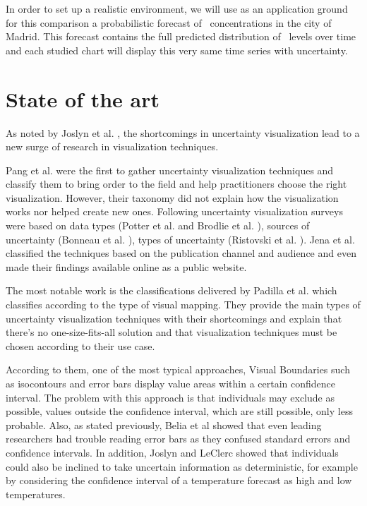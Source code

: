 \documentclass[a4paper,3p,sort&compress]{elsarticle}
\begin{document}
In order to set up a realistic environment, we will use as an application ground
for this comparison a probabilistic forecast of \no~concentrations in the city
of Madrid. This forecast contains the full predicted distribution of \no~levels
over time and each studied chart will display this very same time series with
uncertainty.

\section{State of the art}
\label{sec:results}

As noted by Joslyn et al. \cite{joslyn_communicating_2010}, the shortcomings in uncertainty visualization lead to a new surge of
research in visualization techniques.

Pang et al. \cite{pang_approaches_1997} were the first to gather uncertainty visualization techniques and classify them
to bring order to the field and help
practitioners choose the right visualization. However, their taxonomy did not explain how the visualization works nor helped create new
ones. Following uncertainty visualization surveys were based on data types (Potter et al. \cite{potter_quantification_2012} and Brodlie et al.
\cite{brodlie_review_2012}),
sources of uncertainty (Bonneau et al. \cite{bonneau_overview_2014}), types of uncertainty
(Ristovski et al. \cite{ristovski_uncertainty_2014}). Jena et al. \cite{jena_uncertainty_2020} classified the techniques
based on the publication channel and audience and even made their findings available online as a
public website.

The most notable work is the classifications delivered by Padilla et al. \cite{padilla_uncertainty_2021} which classifies according to
the type of visual mapping. They provide the main types of uncertainty visualization techniques with their shortcomings and
explain that there's no one-size-fits-all solution and that visualization techniques must be chosen according to their use case.

According to them, one of the most typical approaches, Visual Boundaries such as isocontours and error
bars display value areas within a certain confidence interval. The problem with this approach is
that individuals may exclude as possible, values outside the confidence interval, which are still
possible, only less probable. Also, as stated previously, Belia et al \cite{belia_researchers_2005} showed that even leading researchers had
trouble reading error bars as they confused
standard errors and confidence intervals. In addition, Joslyn and LeClerc \cite{joslyn_decisions_2013}
showed that individuals could also be inclined to take uncertain
information as deterministic, for example by considering the confidence interval of a temperature
forecast as high and low temperatures.
\end{document}
